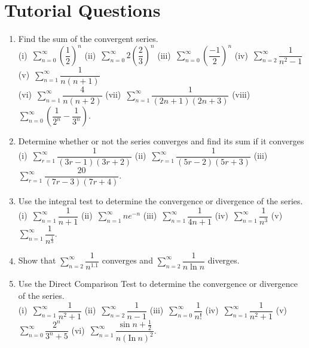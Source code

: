 \documentclass[titlepage,a4paper,12pt]{report}
\begin{document}
\section{Tutorial Questions}
\begin{enumerate}
\item Find the sum of the convergent series.\\
(i)\, $\displaystyle \sum _{n=0}^\infty \left(\dfrac{1}{2}\right)^n$ \quad (ii)\, $\displaystyle \sum _{n=0}^\infty 2\left(\dfrac{2}{3}\right)^n$ \quad (iii)\, $\displaystyle \sum _{n=0}^\infty \left(\dfrac{-1}{2}\right)^n$ \quad (iv)\, $\displaystyle \sum _{n=2}^\infty \dfrac{1}{n^2-1}$ \quad (v)\, $\displaystyle \sum _{n=1}^\infty \dfrac{1}{n(n+1)}$\\
(vi)\, $\displaystyle \sum _{n=1}^\infty \dfrac{4}{n(n+2)}$ \quad (vii)\, $\displaystyle \sum _{n=1}^\infty \dfrac{1}{(2n+1)(2n+3)}$ \quad (viii)\, $\displaystyle \sum _{n=0}^\infty \left(\dfrac{1}{2^n}-\dfrac{1}{3^n}\right)$.
\item Determine whether or not the series converges and find its sum if it converges\\
(i)\, $\displaystyle \sum _{r=1}^\infty \dfrac{1}{(3r-1)(3r+2)}$ \quad (ii)\, $\displaystyle \sum _{r=1}^\infty \dfrac{1}{(5r-2)(5r+3)}$ \quad (iii)\,$\displaystyle \sum _{r=1}^\infty \dfrac{20}{(7r-3)(7r+4)}$.
\item Use the integral test to determine the convergence or divergence of the series.\\
(i)\, $\displaystyle \sum _{n=1}^\infty \dfrac{1}{n+1}$  \quad (ii)\,  $\displaystyle \sum _{n=1}^\infty ne^{-n}$ \quad (iii)\,  $\displaystyle \sum _{n=1}^\infty \dfrac{1}{4n+1}$ \quad (iv)\,  $\displaystyle \sum _{n=1}^\infty \dfrac{1}{n^3}$ \quad (v)\,  $\displaystyle \sum _{n=1}^\infty \dfrac{1}{n^{\frac{1}{3}}}$.
\item Show that $\displaystyle \sum _{n=2}^\infty \dfrac{1}{n^{1.1}}$ converges and $\displaystyle \sum _{n=2}^\infty \dfrac{1}{n\ln n}$ diverges.
\item Use the Direct Comparison Test to determine the convergence or divergence of the series.\\
(i)\, $\displaystyle \sum _{n=1}^\infty \dfrac{1}{n^2+1}$ \quad (ii)\, $\displaystyle \sum _{n=2}^\infty \dfrac{1}{n-1}$ \quad (iii)\, $\displaystyle \sum _{n=0}^\infty \dfrac{1}{n!}$ \quad (iv)\, $\displaystyle \sum _{n=1}^\infty \dfrac{1}{n^2+1}$ \quad (v)\, $\displaystyle \sum _{n=0}^\infty \dfrac{2^n}{3^n+5}$ \quad (vi)\, $\displaystyle \sum_{n=1}^{\infty} \dfrac{\sin n +\frac{1}{2}}{n(\mbox{In}~n)^2}$.

\end{enumerate}
\end{document}
